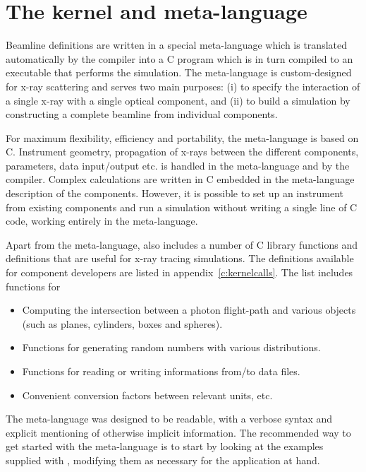 
\chapter{The \MCX kernel and meta-language}
\label{s:kernel}

Beamline definitions are written in a special \MCX meta-language which
is translated automatically by the \MCX compiler into a C program
which is in turn compiled to an executable that
performs the simulation. The meta-language is custom-designed for x-ray
scattering and serves two main purposes: (i) to specify the interaction of a
single x-ray with a single optical component, and (ii) to build a
simulation by constructing a complete beamline from individual
components.

For maximum flexibility, efficiency and portability, the meta-language is based on C.
Instrument geometry, propagation of x-rays between the different
components, parameters, data input/output etc. is handled in the
meta-language and by the \MCX compiler. Complex calculations are written in
C embedded in the meta-language description of the
components. However, it is
possible to set up an instrument from existing components and
run a simulation without writing a single line of C code, working
entirely in the meta-language.

Apart from the meta-language, \MCX also includes a number of C library
functions and definitions that are useful for x-ray tracing
simulations. The definitions available for component developers are
listed in appendix~\ref{c:kernelcalls}. The list includes functions
for
\begin{itemize}
\item Computing the intersection between a photon flight-path and various
  objects (such as planes, cylinders, boxes and spheres).
\item Functions for generating random numbers with various distributions.
\item Functions for reading or writing informations from/to data files.
\item Convenient conversion factors between relevant units, etc.
\end{itemize}

The \MCX meta-language was designed to be readable, with a verbose
syntax and explicit mentioning of otherwise implicit information. The
recommended way to get started with the meta-language is to start by
looking at the examples supplied with \MCX, modifying them as necessary
for the application at hand.

